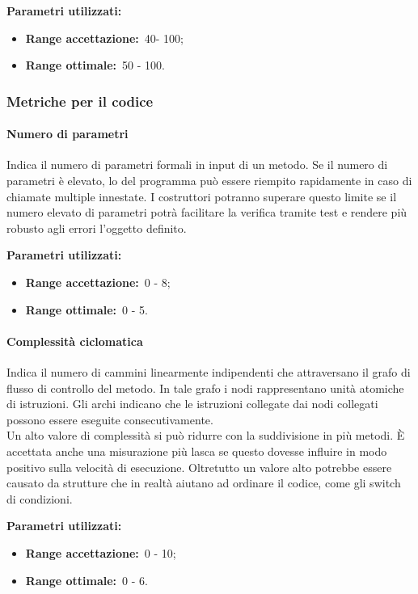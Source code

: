 				\textbf{Parametri utilizzati:}
				\begin{itemize}
					\item \textbf{Range accettazione:}\ 40- 100;
					\item \textbf{Range ottimale:}\ 50 - 100.
				\end{itemize}
		\subsubsection{Metriche per il codice}		
			\label{sec:3.7.3}
			\paragraph{Numero di parametri}
				\label{sec:3.9.3.1}
				Indica il numero di parametri formali in input di un metodo. Se il numero di parametri è elevato, lo  del programma può essere riempito rapidamente in caso di chiamate multiple innestate. I costruttori potranno superare questo limite se il numero elevato di parametri potrà facilitare la verifica tramite test e rendere più robusto agli errori l'oggetto definito.
				
				\textbf{Parametri utilizzati:}
				\begin{itemize}
					\item \textbf{Range accettazione:}\ 0 - 8;
					\item \textbf{Range ottimale:}\ 0 - 5.
				\end{itemize}
			\paragraph{Complessità ciclomatica}
				\label{sec:3.7.3.2}
				Indica il numero di cammini linearmente indipendenti che attraversano il grafo di flusso di controllo del metodo. In tale grafo i nodi rappresentano unità atomiche di istruzioni. Gli archi indicano che le istruzioni collegate dai nodi collegati possono essere eseguite consecutivamente. \\
				Un alto valore di complessità si può ridurre con la suddivisione in più metodi. È accettata anche una misurazione più lasca se questo dovesse influire in modo positivo sulla velocità di esecuzione. Oltretutto un valore alto potrebbe essere causato da strutture che in realtà aiutano ad ordinare il codice, come gli switch di condizioni.
				
				\textbf{Parametri utilizzati:}
				\begin{itemize}
					\item \textbf{Range accettazione:}\ 0 - 10;
					\item \textbf{Range ottimale:}\ 0 - 6.
				\end{itemize}
